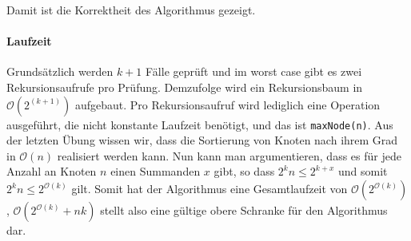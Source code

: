 \documentclass[12pt]{scrartcl}%
\theoremstyle{nonumberplain}
\newcommand{\bO}[1]{\mathcal O(#1)}
\newcommand{\code}[1]{\lstinline[basicstyle=\ttfamily\color{black}]{#1}}
\begin{document}
Damit ist die Korrektheit des Algorithmus gezeigt.

\paragraph{Laufzeit}

Grundsätzlich werden $k+1$ Fälle geprüft und im worst case gibt es zwei Rekursionsaufrufe pro Prüfung. Demzufolge wird ein Rekursionsbaum in $\bO{2^(k+1)}$ aufgebaut. Pro Rekursionsaufruf wird lediglich eine Operation ausgeführt, die nicht konstante Laufzeit benötigt, und das ist \code{maxNode(n)}. Aus der letzten Übung wissen wir, dass die Sortierung von Knoten nach ihrem Grad in $\bO{n}$ realisiert werden kann. Nun kann man argumentieren, dass es für jede Anzahl an Knoten $n$ einen Summanden $x$ gibt, so dass $2^kn \le 2^{k+x}$ und somit $2^kn \le 2^{\bO{k}}$ gilt. Somit hat der Algorithmus eine Gesamtlaufzeit von $\bO{2^{\bO{k}}}$, $\bO{2^{\bO{k}} + nk}$ stellt also eine gültige obere Schranke für den Algorithmus dar.
\end{document}
